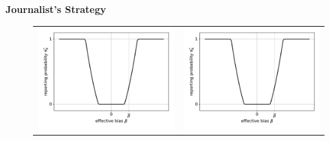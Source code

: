 \documentclass{article}
\begin{document}
\pagebreak
\begin{center}
	\textbf{Journalist's Strategy}
\end{center}
\begin{figure}[h]
	\begin{center}
		\begin{tabular}{cc}
			\includegraphics[scale=.5]{effective_bias_reporting_probability} & \includegraphics[scale=.5]{effective_bias_reporting_probability} \\
		\end{tabular}
	\end{center}
\end{figure}
\end{document}
